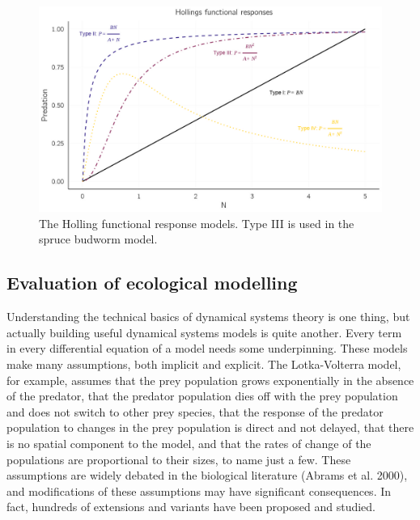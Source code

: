 \documentclass[
  a4paper,
  DIV=11,
  numbers=noendperiod]{scrreprt}
\begin{document}
\begin{figure}

{\centering \includegraphics{media/ch4n/fig-ch4n-img5-old-53.jpg}

}

\caption{\label{fig-ch4n-img5-old-53}The Holling functional response
models. Type III is used in the spruce budworm model.}

\end{figure}

\hypertarget{sec-Evaluation-of-ecological-modelling}{%
\subsection{Evaluation of ecological
modelling}\label{sec-Evaluation-of-ecological-modelling}}

Understanding the technical basics of dynamical systems theory is one
thing, but actually building useful dynamical systems models is quite
another. Every term in every differential equation of a model needs some
underpinning. These models make many assumptions, both implicit and
explicit. The Lotka-Volterra model, for example, assumes that the prey
population grows exponentially in the absence of the predator, that the
predator population dies off with the prey population and does not
switch to other prey species, that the response of the predator
population to changes in the prey population is direct and not delayed,
that there is no spatial component to the model, and that the rates of
change of the populations are proportional to their sizes, to name just
a few. These assumptions are widely debated in the biological literature
(Abrams et al. 2000), and modifications of these assumptions may have
significant consequences. In fact, hundreds of extensions and variants
have been proposed and studied.
\end{document}
